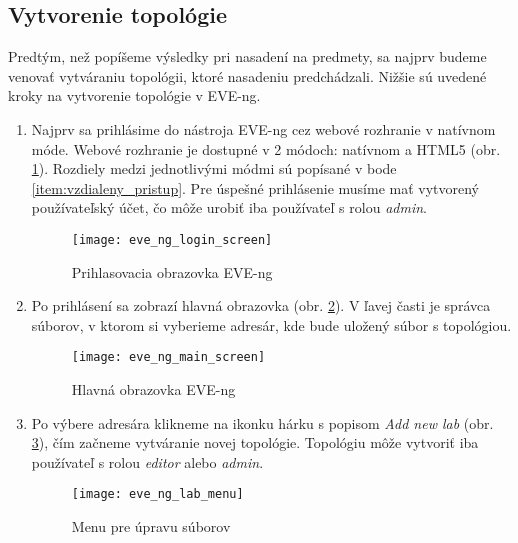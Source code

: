 \subsection{Vytvorenie topológie}
\label{chap:vytvorenie_topo_eve-ng}
Predtým, než popíšeme výsledky pri nasadení na predmety, sa najprv budeme venovať vytváraniu topológii, ktoré nasadeniu predchádzali. Nižšie sú uvedené kroky na vytvorenie topológie v EVE-ng.

\begin{enumerate}[noitemsep]

    \item \label{item:prihlasenie} Najprv sa prihlásime do nástroja EVE-ng cez webové rozhranie v natívnom móde. Webové rozhranie je dostupné v 2 módoch: natívnom a HTML5 (obr. \ref{obr:eve_ng_login_screen}). Rozdiely medzi jednotlivými módmi sú popísané v bode \ref{item:vzdialeny_pristup}. Pre úspešné prihlásenie musíme mať vytvorený používateľský účet, čo môže urobiť iba používateľ s rolou \emph{admin}.

\begin{figure}
    \centering
    \texttt{[image: eve\_ng\_login\_screen]}
    \caption{Prihlasovacia obrazovka EVE-ng}
    \label{obr:eve_ng_login_screen}
\end{figure}

    \item Po prihlásení sa zobrazí hlavná obrazovka (obr. \ref{obr:eve_ng_main_screen}). V ľavej časti je správca súborov, v ktorom si vyberieme adresár, kde bude uložený súbor s topológiou.

\begin{figure}
    \centering
    \texttt{[image: eve\_ng\_main\_screen]}
    \caption{Hlavná obrazovka EVE-ng}
    \label{obr:eve_ng_main_screen}
\end{figure}

    \item Po výbere adresára klikneme na ikonku hárku s popisom \emph{Add new lab} (obr. \ref{obr:eve_ng_lab_menu}), čím začneme vytváranie novej topológie. Topológiu môže vytvoriť iba používateľ s rolou \emph{editor} alebo \emph{admin}.

\begin{figure}
    \centering
        \texttt{[image: eve\_ng\_lab\_menu]}
    \caption{Menu pre úpravu súborov}
    \label{obr:eve_ng_lab_menu}
\end{figure}


\end{enumerate}
